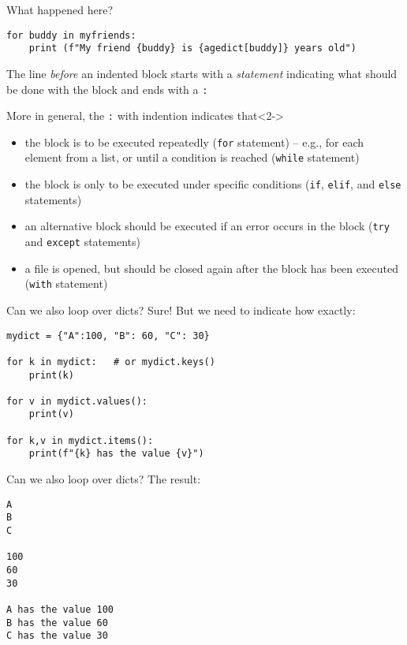 \documentclass[compress]{beamer}
\begin{document}
\begin{frame}[fragile]{What happened here?}
\begin{lstlisting}
for buddy in myfriends:
    print (f"My friend {buddy} is {agedict[buddy]} years old")
\end{lstlisting}
\small
The line \emph{before} an indented block starts with a \emph{statement} indicating what should be done with the block and ends with a \texttt{:}

\footnotesize
\begin{block}{More in general, the \texttt{:} with indention indicates that}<2->
	\begin{itemize}
		\item<3-> the block is to be executed repeatedly (\texttt{for} statement) – e.g., for each element from a list, or until a condition is reached (\texttt{while} statement)
		\item<4-> the block is only to be executed under specific conditions (\texttt{if}, \texttt{elif}, and \texttt{else} statements)
		\item<5-> an alternative block should be executed if an error occurs in the block (\texttt{try} and \texttt{except} statements)
		\item<6-> a file is opened, but should be closed again after the block has been executed (\texttt{with} statement)
	\end{itemize}
\end{block}
\end{frame}



\begin{frame}[fragile]{Can we also loop over dicts?}
Sure! But we need to indicate how exactly:

\begin{lstlisting}
mydict = {"A":100, "B": 60, "C": 30}

for k in mydict:   # or mydict.keys()
    print(k)

for v in mydict.values():
    print(v)

for k,v in mydict.items():
    print(f"{k} has the value {v}")
\end{lstlisting}

\end{frame}




\begin{frame}[fragile]{Can we also loop over dicts?}
The result:

\begin{lstlisting}
A
B
C

100
60
30

A has the value 100
B has the value 60
C has the value 30
\end{lstlisting}

\end{frame}
\end{document}
